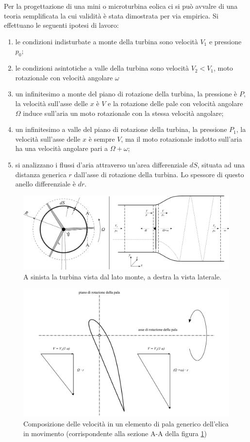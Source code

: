 Per la progettazione di una mini o microturbina eolica ci si può avvalre di una teoria semplificata la cui validità è stata dimostrata per via empirica. Si effettuano le seguenti ipotesi di lavoro:
\begin{enumerate}
\item le condizioni indisturbate a monte della turbina sono velocità $V_1$ e pressione $p_0$;
\item le condizioni asintotiche a valle della turbina sono velocità $V_2 < V_1$, moto rotazionale con velocità angolare $\omega$
\item un infinitesimo a monte del piano di rotazione della turbina, la pressione è $P$, la velocità sull'asse delle $x$ è $V$ e la rotazione delle pale con velocità angolare $\Omega$ induce sull'aria un moto rotazionale con la stessa velocità angolare;
\item un infinitesimo a valle del piano di rotazione della turbina, la pressione $P_1$, la velocità sull'asse delle $x$ è sempre $V$, ma il moto rotazionale indotto sull'aria ha una velocità angolare pari a $\Omega+\omega$;
\item si analizzano i flussi d'aria attraverso un'area differenziale $dS$, situata ad una distanza generica $r$ dall'asse di rotazione della turbina. Lo spessore di questo anello differenziale è $dr$.
\end{enumerate}
\begin{figure}
\centering
  \includegraphics[width=\textwidth]{fig/frontlatEol.pdf}
\caption{A sinista la turbina vista dal lato monte, a destra la vista laterale.}
\label{fig:frontlatEol}
\end{figure}
\begin{figure}
\centering
  \includegraphics[width=\textwidth]{fig/triangEol.pdf}
\caption{Composizione delle velocità in un elemento di pala generico dell'elica in movimento (corrispondente alla sezione A-A della figura \ref{fig:frontlatEol})}
\label{fig:triangEol}
\end{figure}
